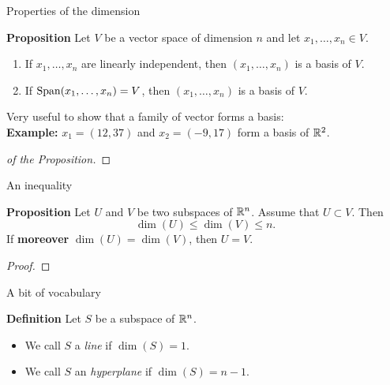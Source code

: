 \documentclass{beamer}
\begin{document}
\begin{frame}[t]{Properties of the dimension}
	\grid
	\vspace{-0.3cm}
	\begin{block}{\bf Proposition}
		Let $V$ be a vector space of dimension $n$ and let $x_1, \dots, x_n \in V$.
		\begin{enumerate}
			\item If $x_1, \dots, x_n$ are linearly independent, then $(x_1, \dots, x_n)$ is a basis of $V$.
			\item If ${{\rm Span}}(x_1, \dots, x_n) = V$, then $(x_1, \dots, x_n)$ is a basis of $V$.
		\end{enumerate}
	\end{block}

	\vspace{0.3cm}

	Very useful to show that a family of vector forms a basis:
	\\
	\vspace{0.3cm}
	\textbf{Example:} $x_1 = (12,37)$ and $x_2 = (-9,17)$ form a basis of $\mathbb{R}^2$.

	\vspace{1.9cm}

	\begin{proof}[of the Proposition]
	\end{proof}
\end{frame}

\begin{frame}[t]{An inequality}
	\grid
	\vspace{-0.4cm}
	\begin{block}{\bf Proposition}
		Let	$U$ and $V$ be two subspaces of $\mathbb{R}^n$. Assume that $U \subset V$. Then
		$$
		\dim(U) \leq \dim(V) \leq n.
		$$
		If \textbf{moreover} $\dim(U) = \dim(V)$, then $U = V$.
	\end{block}
	\pause
	\begin{proof}
		\vspace{3.5cm}
		\vfill
	\end{proof}
\end{frame}

\begin{frame}[t]{A bit of vocabulary}
	\grid
	\vspace{-0.4cm}
	\begin{block}{\bf Definition}
		Let $S$ be a subspace of $\mathbb{R}^n$.
		\begin{itemize}
			\item We call $S$ a \emph{line} if $\dim(S) = 1$.
			\item We call $S$ an \emph{hyperplane} if $\dim(S) = n-1$.
		\end{itemize}
	\end{block}
\end{frame}
\end{document}
